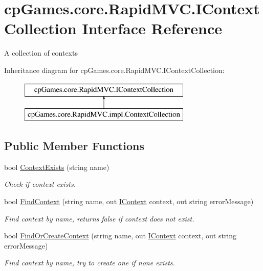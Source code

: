 \hypertarget{interfacecp_games_1_1core_1_1_rapid_m_v_c_1_1_i_context_collection}{}\section{cp\+Games.\+core.\+Rapid\+M\+V\+C.\+I\+Context\+Collection Interface Reference}
\label{interfacecp_games_1_1core_1_1_rapid_m_v_c_1_1_i_context_collection}


A collection of contexts  


Inheritance diagram for cp\+Games.\+core.\+Rapid\+M\+V\+C.\+I\+Context\+Collection\+:\begin{figure}[H]
\begin{center}
\leavevmode
\includegraphics[height=2.000000cm]{interfacecp_games_1_1core_1_1_rapid_m_v_c_1_1_i_context_collection}
\end{center}
\end{figure}
\subsection*{Public Member Functions}
\begin{DoxyCompactItemize}
\item 
bool \mbox{\hyperlink{interfacecp_games_1_1core_1_1_rapid_m_v_c_1_1_i_context_collection_a1064f8516b93d0a9def640401ab0da26}{Context\+Exists}} (string name)
\begin{DoxyCompactList}\small\item\em Check if context exists. \end{DoxyCompactList}\item 
bool \mbox{\hyperlink{interfacecp_games_1_1core_1_1_rapid_m_v_c_1_1_i_context_collection_a6c71646f1bf15267a72d0b48217eb7bc}{Find\+Context}} (string name, out \mbox{\hyperlink{interfacecp_games_1_1core_1_1_rapid_m_v_c_1_1_i_context}{I\+Context}} context, out string error\+Message)
\begin{DoxyCompactList}\small\item\em Find context by name, returns false if context does not exist. \end{DoxyCompactList}\item 
bool \mbox{\hyperlink{interfacecp_games_1_1core_1_1_rapid_m_v_c_1_1_i_context_collection_acc4e1011e01db9131da699c3faf22726}{Find\+Or\+Create\+Context}} (string name, out \mbox{\hyperlink{interfacecp_games_1_1core_1_1_rapid_m_v_c_1_1_i_context}{I\+Context}} context, out string error\+Message)
\begin{DoxyCompactList}\small\item\em Find context by name, try to create one if none exists. \end{DoxyCompactList}\end{DoxyCompactItemize}
